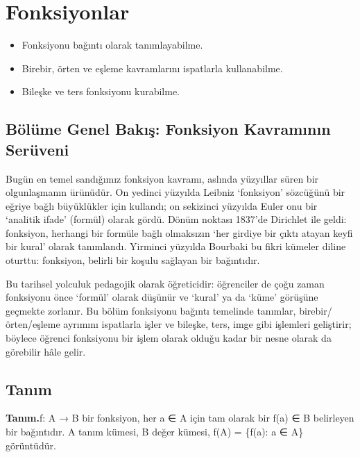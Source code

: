 \chapter{Fonksiyonlar}
\label{chap:fonksiyonlar}


\par{}\nopagebreak

\begin{itemize}\setlength{\itemsep}{2pt}\setlength{\parskip}{0pt}
\item Fonksiyonu bağıntı olarak tanımlayabilme.
\item Birebir, örten ve eşleme kavramlarını ispatlarla kullanabilme.
\item Bileşke ve ters fonksiyonu kurabilme.
\end{itemize}

\section*{Bölüme Genel Bakış: Fonksiyon Kavramının Serüveni}

Bugün en temel sandığımız fonksiyon kavramı, aslında yüzyıllar süren bir olgunlaşmanın ürünüdür. On yedinci yüzyılda Leibniz ‘fonksiyon’ sözcüğünü bir eğriye bağlı büyüklükler için kullandı; on sekizinci yüzyılda Euler onu bir ‘analitik ifade’ (formül) olarak gördü. Dönüm noktası 1837’de Dirichlet ile geldi: fonksiyon, herhangi bir formüle bağlı olmaksızın ‘her girdiye bir çıktı atayan keyfi bir kural’ olarak tanımlandı. Yirminci yüzyılda Bourbaki bu fikri kümeler diline oturttu: fonksiyon, belirli bir koşulu sağlayan bir bağıntıdır.

Bu tarihsel yolculuk pedagojik olarak öğreticidir: öğrenciler de çoğu zaman fonksiyonu önce ‘formül’ olarak düşünür ve ‘kural’ ya da ‘küme’ görüşüne geçmekte zorlanır. Bu bölüm fonksiyonu bağıntı temelinde tanımlar, birebir/örten/eşleme ayrımını ispatlarla işler ve bileşke, ters, imge gibi işlemleri geliştirir; böylece öğrenci fonksiyonu bir işlem olarak olduğu kadar bir nesne olarak da görebilir hâle gelir.

\section{Tanım}

\begin{tcolorbox}[bookbox,colback=cDef]\textbf{\textsf{\textcolor{cAcc}{Tanım.}}}\quad f: A → B bir fonksiyon, her a ∈ A için tam olarak bir f(a) ∈ B belirleyen bir bağıntıdır. A tanım kümesi, B değer kümesi, f(A) = \{f(a): a ∈ A\} görüntüdür.\end{tcolorbox}


